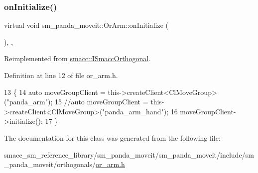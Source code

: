 \subsubsection{\texorpdfstring{on\+Initialize()}{onInitialize()}}
{\footnotesize\ttfamily virtual void sm\+\_\+panda\+\_\+moveit\+::\+Or\+Arm\+::on\+Initialize (\begin{DoxyParamCaption}{ }\end{DoxyParamCaption})\hspace{0.3cm}{\ttfamily [inline]}, {\ttfamily [override]}, {\ttfamily [virtual]}}



Reimplemented from \hyperlink{classsmacc_1_1ISmaccOrthogonal_a6bb31c620cb64dd7b8417f8705c79c7a}{smacc\+::\+I\+Smacc\+Orthogonal}.



Definition at line 12 of file or\+\_\+arm.\+h.


\begin{DoxyCode}
13     \{
14         \textcolor{keyword}{auto} moveGroupClient = this->createClient<ClMoveGroup>(\textcolor{stringliteral}{"panda\_arm"});
15         \textcolor{comment}{//auto moveGroupClient = this->createClient<ClMoveGroup>("panda\_arm\_hand");}
16         moveGroupClient->initialize();
17     \}
\end{DoxyCode}


The documentation for this class was generated from the following file\+:\begin{DoxyCompactItemize}
\item 
smacc\+\_\+sm\+\_\+reference\+\_\+library/sm\+\_\+panda\+\_\+moveit/sm\+\_\+panda\+\_\+moveit/include/sm\+\_\+panda\+\_\+moveit/orthogonals/\hyperlink{sm__panda__moveit_2sm__panda__moveit_2include_2sm__panda__moveit_2orthogonals_2or__arm_8h}{or\+\_\+arm.\+h}\end{DoxyCompactItemize}
